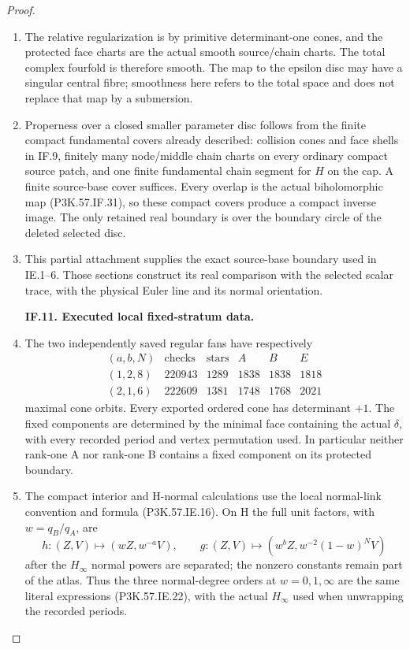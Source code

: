 \begin{proof}
\begin{enumerate}[label=\arabic*.]
\item The relative regularization is by primitive determinant-one cones,
and the protected face charts are the actual smooth source/chain
charts. The total complex fourfold is therefore smooth. The map
to the epsilon disc may have a singular central fibre; smoothness
here refers to the total space and does not replace that map by a
submersion.

\item Properness over a closed smaller parameter disc follows from the
finite compact fundamental covers already described: collision
cones and face shells in IF.9, finitely many node/middle chain
charts on every ordinary compact source patch, and one finite
fundamental chain segment for \(H\) on the cap. A finite source-base
cover suffices. Every overlap is the actual biholomorphic map
(P3K.57.IF.31), so these compact covers produce a compact inverse image.
The only retained real boundary is over the boundary circle of the
deleted selected disc.

\item This partial attachment supplies the exact source-base boundary used in
IE.1--6. Those sections construct its real comparison with the selected
scalar trace, with the physical Euler line and its normal orientation.

\par\medskip\noindent\textbf{IF.11. Executed local fixed-stratum data.}\par\nopagebreak[4]

\item The two independently saved regular fans have respectively
\[
 \begin{array}{c|r|r|rrr}
 (a,b,N)&\text{checks}&\text{stars}&A&B&E\\ \hline
 (1,2,8)&220943&1289&1838&1838&1818\\
 (2,1,6)&222609&1381&1748&1768&2021
 \end{array}
\]
maximal cone orbits. Every exported ordered cone has determinant \(+1\).
The fixed components are determined by the minimal face containing
the actual \(\delta\), with every recorded period and vertex
permutation used. In particular neither rank-one A nor rank-one B
contains a fixed component on its protected boundary.

\item The compact interior and H-normal calculations use the local
normal-link convention and formula (P3K.57.IE.16). On H the full unit
factors, with \(w=q_B/q_A\), are
\[
 h:(Z,V)\mapsto(wZ,w^{-a}V),\qquad
 g:(Z,V)\mapsto(w^bZ,w^{-2}(1-w)^NV)
\]
after the \(H_\infty\) normal powers are separated; the nonzero
constants remain part of the atlas. Thus the three normal-degree
orders at \(w=0,1,\infty\) are the same literal expressions
(P3K.57.IE.22), with the actual \(H_\infty\) used when unwrapping
the recorded periods.


\end{enumerate}
\end{proof}
